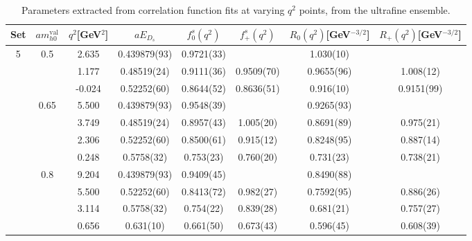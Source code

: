 \begin{table}
  \begin{center}
    \begin{tabular}{ c c c c c c c c }
      \hline
      Set & $am_{h0}^{\text{val}}$ & $q^2$[GeV$^2$]& $aE_{D_s}$& $f^s_0(q^2)$& $f^s_+(q^2)$& $R_0(q^2)$[GeV$^{-3/2}$]& $R_+(q^2)$[GeV$^{-3/2}$]\\ [0.5ex]
      \hline\hline 
      5 & 0.5 & 2.635 & 0.439879(93) & 0.9721(33) &  & 1.030(10) & \\ [0.5ex]
      &  & 1.177 & 0.48519(24) & 0.9111(36) & 0.9509(70) & 0.9655(96) & 1.008(12)\\ [0.5ex]
      &  & -0.024 & 0.52252(60) & 0.8644(52) & 0.8636(51) & 0.916(10) & 0.9151(99)\\ [0.5ex]
      \hline 
      & 0.65 & 5.500 & 0.439879(93) & 0.9548(39) &  & 0.9265(93) & \\ [0.5ex]
      &  & 3.749 & 0.48519(24) & 0.8957(43) & 1.005(20) & 0.8691(89) & 0.975(21)\\ [0.5ex]
      &  & 2.306 & 0.52252(60) & 0.8500(61) & 0.915(12) & 0.8248(95) & 0.887(14)\\ [0.5ex]
      &  & 0.248 & 0.5758(32) & 0.753(23) & 0.760(20) & 0.731(23) & 0.738(21)\\ [0.5ex]
      \hline 
      & 0.8 & 9.204 & 0.439879(93) & 0.9409(45) &  & 0.8490(88) & \\ [0.5ex]
      &  & 5.500 & 0.52252(60) & 0.8413(72) & 0.982(27) & 0.7592(95) & 0.886(26)\\ [0.5ex]
      &  & 3.114 & 0.5758(32) & 0.754(22) & 0.839(28) & 0.681(21) & 0.757(27)\\ [0.5ex]
      &  & 0.656 & 0.631(10) & 0.661(50) & 0.673(43) & 0.596(45) & 0.608(39)\\ [0.5ex]
      \hline\hline 
    \end{tabular}
    \caption{Parameters extracted from correlation function fits at varying $q^2$ points, from the ultrafine ensemble. \label{tab:kinetic2}}
    \end{center}
\end{table}
